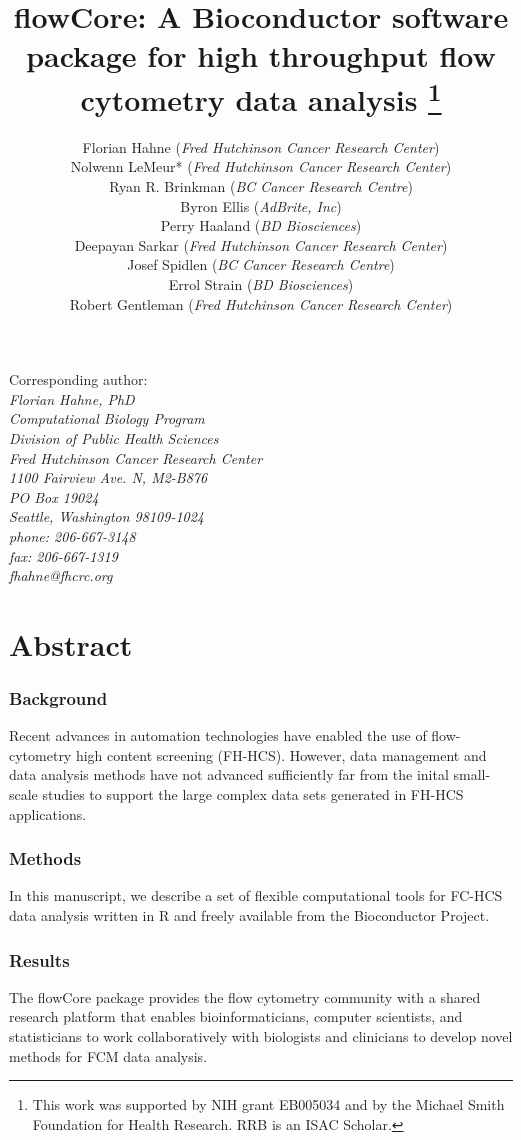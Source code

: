 \documentclass[12pt]{article}
\title{flowCore: A Bioconductor software package for high throughput
  flow cytometry data analysis \footnote{This work was supported by
    NIH grant EB005034 and by the Michael Smith Foundation for Health
    Research. RRB is an ISAC Scholar.}}
\author{Florian Hahne (\textit{Fred Hutchinson Cancer Research
    Center})\\
  Nolwenn LeMeur* (\textit{Fred Hutchinson Cancer Research Center})\\
  Ryan R. Brinkman (\textit{BC Cancer Research Centre})\\
  Byron Ellis (\textit{AdBrite, Inc})\\
  Perry Haaland (\textit{BD Biosciences})\\
  Deepayan Sarkar (\textit{Fred Hutchinson Cancer Research
    Center})\\
  Josef Spidlen (\textit{BC Cancer Research Centre})\\
  Errol Strain (\textit{BD Biosciences})\\
  Robert Gentleman (\textit{Fred Hutchinson Cancer Research
    Center})\\
}
\newcommand{\Rpackage}[1]{{\textsf{#1}}}
\begin{document}
\begin{singlespace}
\maketitle
Corresponding author:\\
\textit{
  Florian Hahne, PhD\\
  Computational Biology Program\\
  Division of Public Health Sciences\\
  Fred Hutchinson Cancer Research Center\\
  1100 Fairview Ave. N, M2-B876\\
  PO Box 19024\\
  Seattle, Washington 98109-1024\\
  phone: 206-667-3148\\
  fax: 206-667-1319\\
  fhahne@fhcrc.org
}


\end{singlespace}

\section*{Abstract}
\subsubsection*{Background}
Recent advances in automation technologies have enabled the use of
flow-cytometry high content screening (FH-HCS). However, data
management and data analysis methods have not advanced sufficiently
far from the inital small-scale studies to support the large complex
data sets generated in FH-HCS applications.
\subsubsection*{Methods}
In this manuscript, we describe a set of flexible
computational tools for FC-HCS data analysis written 
in R and freely available from the Bioconductor Project.

\subsubsection*{Results}
The \Rpackage{flowCore} package provides the flow cytometry community
with a shared research platform that enables bioinformaticians,
computer scientists, and statisticians to work collaboratively with
biologists and clinicians to develop novel methods for FCM data
analysis.
\end{document}
